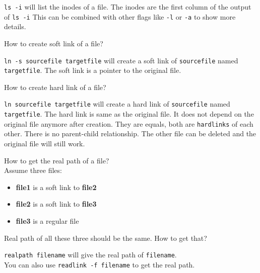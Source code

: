\begin{ans}
  \lstinline|ls -i| will list the inodes of a file.
  The inodes are the first column of the output of \lstinline|ls -i|
  This can be combined with other flags like \lstinline|-l| or \lstinline|-a| to show more details.
\end{ans}

\begin{qs}
  How to create soft link of a file?
\end{qs}

\begin{ans}
  \lstinline|ln -s sourcefile targetfile| will create a soft link of \lstinline|sourcefile|
  named \lstinline|targetfile|.
  The soft link is a pointer to the original file.
\end{ans}

\begin{qs}
  How to create hard link of a file?
\end{qs}

\begin{ans}
  \lstinline|ln sourcefile targetfile| will create a hard link of \lstinline|sourcefile|
  named \lstinline|targetfile|. The hard link is same as the original file. It does
  not depend on the original file anymore after creation. They are equals,
  both are \lstinline|hardlinks| of each other. There is no parent-child relationship.
  The other file can be deleted and the original file will still work.
\end{ans}

\begin{qs}
  How to get the real path of a file?\\
  Assume three files:
  \begin{itemize}
    \item \textbf{file1} is a soft link to \textbf{file2}
    \item \textbf{file2} is a soft link to \textbf{file3}
    \item \textbf{file3} is a regular file
  \end{itemize}
  Real path of all these three should be the same. How to get that?
\end{qs}

\begin{ans}
  \lstinline|realpath filename| will give the real path of \lstinline|filename|. \\
  You can also use \lstinline|readlink -f filename| to get the real path.
\end{ans}



